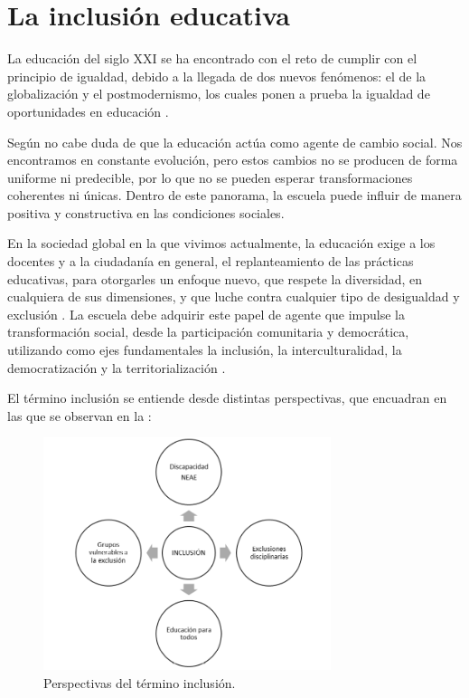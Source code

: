 \documentclass{textolivre}
\begin{document}
\section{La inclusión educativa}
La educación del siglo XXI se ha encontrado con el reto de cumplir con el principio de igualdad, debido a la llegada de dos nuevos fenómenos: el de la globalización y el postmodernismo, los cuales ponen a prueba la igualdad de oportunidades en educación \cite{garciapedraza2015}.

Según \textcite{reales2005} no cabe duda de que la educación actúa como agente de cambio social. Nos encontramos en constante evolución, pero estos cambios no se producen de forma uniforme ni predecible, por lo que no se pueden esperar transformaciones coherentes ni únicas. Dentro de este panorama, la escuela puede influir de manera positiva y constructiva en las condiciones sociales.

En la sociedad global en la que vivimos actualmente, la educación exige a los docentes y a la ciudadanía en general, el replanteamiento de las prácticas educativas, para otorgarles  un enfoque nuevo, que respete la diversidad, en cualquiera de sus dimensiones, y que luche contra cualquier tipo de desigualdad y exclusión \cite{carmona-santiago2019}. La escuela debe adquirir este papel de agente que impulse la transformación social, desde la participación comunitaria y democrática, utilizando como ejes fundamentales la inclusión, la interculturalidad, la democratización y la territorialización \cite{salesciges2019}.

El término inclusión se entiende desde distintas perspectivas, que \textcite{caberoalmenara2017} encuadran en las que se observan en la :

\begin{figure}[htbp]
 \centering
 \includegraphics[width=0.75\textwidth]{imagem1.png}
 \caption{Perspectivas del término inclusión.}
 \label{fig1}
\end{figure}
\end{document}
